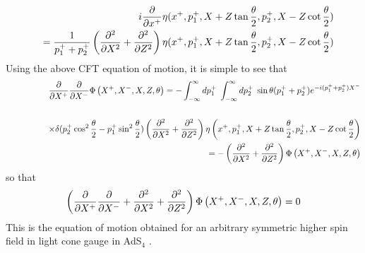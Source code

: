 \documentclass[a4paper,12pt]{article}
\begin{document}
%
\begin{eqnarray}
&&i{\partial\over\partial x^+}\eta(x^+,p_1^+,X+Z\tan {\theta\over2},p_2^+,X-Z\cot {\theta\over2})\cr
&&={1\over p_1^++p_2^+}\left({\partial^2\over\partial X^2}+{\partial^2\over\partial Z^2}\right)
\eta(x^+,p_1^+,X+Z\tan {\theta\over2},p_2^+,X-Z\cot {\theta\over2})
\end{eqnarray}
Using the above CFT equation of motion, it is simple to see that
%
\begin{eqnarray}
&&{\partial\over\partial X^+}{\partial\over\partial X^-}
\Phi\left(X^+,X^-,X,Z,\theta\right)=-\int_{-\infty}^\infty dp_1^+ \;\int_{-\infty}^\infty dp_2^+
\; \sin\theta (p_1^++p_2^+)
e^{-i(p_1^++p_2^+)X^-}\cr\cr
&&\qquad\qquad\times\delta (p_2^+\cos^2 {\theta\over 2}-p_1^+\sin^2 {\theta\over 2})
\left({\partial^2\over\partial X^2}+{\partial^2\over\partial Z^2}\right)\eta\left(x^+,p_1^+,X+Z\tan {\theta\over2},
p_2^+,X-Z\cot{\theta\over 2}\right)\cr
&&\qquad\qquad
=-\left({\partial^2\over\partial X^2}+{\partial^2\over\partial Z^2}\right)\Phi\left(X^+,X^-,X,Z,\theta\right)
\end{eqnarray}
so that
%
\begin{eqnarray}
\left({\partial\over\partial X^+}{\partial\over\partial X^-}+
{\partial^2\over\partial X^2}+{\partial^2\over\partial Z^2}\right)\Phi\left(X^+,X^-,X,Z,\theta\right)=0
\end{eqnarray}
%
This is the equation of motion obtained for an arbitrary symmetric higher spin field in light cone gauge in 
AdS$_4$ \cite{Metsaev:1999ui}.
\end{document}
